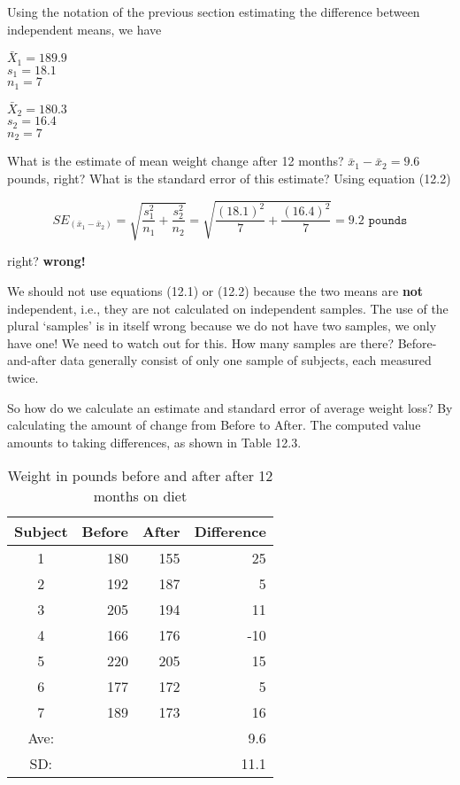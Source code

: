 \documentclass[11pt]{book}\usepackage[]{graphicx}\usepackage[]{color}
\begin{document}
Using the notation of the previous section estimating the difference between independent means, we have

\begin{center}
\begin{minipage}[ht]{3cm}

$\bar{X}_1 = 189.9$ \\
$s_1 = 18.1$ \\
$n_1 = 7$ 
\end{minipage}
\begin{minipage}[ht]{3cm}

$\bar{X}_2 = 180.3$ \\
$s_2 = 16.4$ \\
$n_2 = 7$ 
\end{minipage}
\end{center}

What is the estimate of mean weight change after 12 months?  $\bar{x}_1 - \bar{x}_2 = 9.6$ pounds, right?  What is the standard error of this estimate? Using equation (12.2) 

\begin{equation*}
SE_{(\bar{x}_1 - \bar{x}_2)} = \sqrt{\frac{s_1^2}{n_1}  + \frac{s_2^2}{n_2} } = \sqrt{\frac{(18.1)^2}{7}  + \frac{(16.4)^2}{7} } = 9.2 \texttt{ pounds}
\end{equation*}

right?  \textbf{wrong!}

We should not use equations (12.1) or (12.2) because the two means are \textbf{not} independent, i.e., they are not calculated on independent samples. The use of the plural `samples' is in itself wrong because we do not have two samples, we only have one! We need to watch out for this.  How many samples are there?  Before-and-after data generally consist of only one sample of subjects, each measured twice.

So how do we calculate an estimate and standard error of average weight loss?  
By calculating the amount of change from Before to After.  The computed value amounts to taking differences, as shown in Table 12.3.

\begin{table}[ht]
\centering
\caption{Weight in pounds before and after after 12 months on diet}
\begin{tabular}{@{} crrr @{}} \hline
Subject & Before & After & Difference \\ \hline
1 & 180 & 155 & 25 \\
2 & 192 & 187 & 5 \\
3 & 205 & 194 & 11 \\
4 & 166 & 176 & -10 \\
5 & 220 & 205 & 15 \\
6 & 177 & 172 & 5 \\
7 & 189 & 173 & 16 \\ \hline
Ave: &  &  & 9.6 \\
SD:  &  & & 11.1 \\ \hline
\end{tabular}
\end{table}
\end{document}
